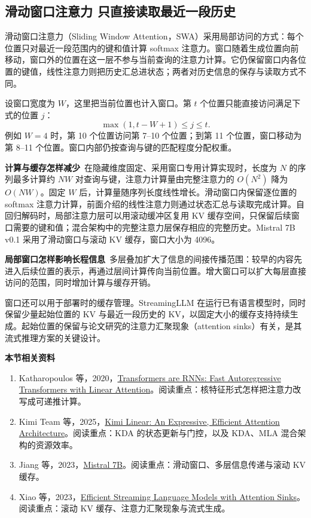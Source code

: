 \subsection{滑动窗口注意力 只直接读取最近一段历史}

滑动窗口注意力（Sliding Window Attention，SWA）采用局部访问的方式：每个位置只对最近一段范围内的键和值计算 softmax 注意力。窗口随着生成位置向前移动，窗口外的位置在这一层不参与当前查询的注意力计算。它仍保留窗口内各位置的键值，线性注意力则把历史汇总进状态；两者对历史信息的保存与读取方式不同。

设窗口宽度为 $W$，这里把当前位置也计入窗口。第 $t$ 个位置只能直接访问满足下式的位置 $j$：
\[
    \max(1,t-W+1)\leq j\leq t.
\]
例如 $W=4$ 时，第 10 个位置访问第 7--10 个位置；到第 11 个位置，窗口移动为第 8--11 个位置。窗口内部仍按查询与键的匹配程度分配权重。

\textbf{计算与缓存怎样减少}~在隐藏维度固定、采用窗口专用计算实现时，长度为 $N$ 的序列最多计算约 $NW$ 对查询与键，注意力计算量由完整注意力的 $O(N^2)$ 降为 $O(NW)$。固定 $W$ 后，计算量随序列长度线性增长。滑动窗口内保留逐位置的 softmax 注意力计算，前面介绍的线性注意力则通过状态汇总与读取完成计算。自回归解码时，局部注意力层可以用滚动缓冲区复用 KV 缓存空间，只保留后续窗口需要的键和值；混合架构中的完整注意力层保存相应的完整历史。Mistral 7B v0.1 采用了滑动窗口与滚动 KV 缓存，窗口大小为 4096。

\textbf{局部窗口怎样影响长程信息}~多层叠加扩大了信息的间接传播范围：较早的内容先进入后续位置的表示，再通过层间计算传向当前位置。增大窗口可以扩大每层直接访问的范围，同时增加计算与缓存开销。

窗口还可以用于部署时的缓存管理。StreamingLLM 在运行已有语言模型时，同时保留少量起始位置的 KV 与最近一段历史的 KV，以固定大小的缓存支持持续生成。起始位置的保留与论文研究的注意力汇聚现象（attention sinks）有关，是其流式推理方案的关键设计。

\textbf{本节相关资料}
\begin{enumerate}
    \item Katharopoulos 等，2020，\href{https://arxiv.org/abs/2006.16236}{Transformers are RNNs: Fast Autoregressive Transformers with Linear Attention}。阅读重点：核特征形式怎样把注意力改写成可递推计算。
    \item Kimi Team 等，2025，\href{https://arxiv.org/abs/2510.26692}{Kimi Linear: An Expressive, Efficient Attention Architecture}。阅读重点：KDA 的状态更新与门控，以及 KDA、MLA 混合架构的资源效率。
    \item Jiang 等，2023，\href{https://arxiv.org/abs/2310.06825}{Mistral 7B}。阅读重点：滑动窗口、多层信息传递与滚动 KV 缓存。
    \item Xiao 等，2023，\href{https://arxiv.org/abs/2309.17453}{Efficient Streaming Language Models with Attention Sinks}。阅读重点：滚动 KV 缓存、注意力汇聚现象与流式生成。
\end{enumerate}
